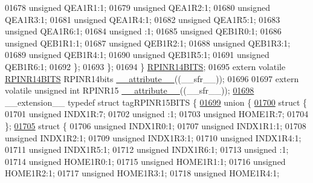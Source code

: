 \begin{DoxyCode}
01678       \textcolor{keywordtype}{unsigned} QEA1R1:1;
01679       \textcolor{keywordtype}{unsigned} QEA1R2:1;
01680       \textcolor{keywordtype}{unsigned} QEA1R3:1;
01681       \textcolor{keywordtype}{unsigned} QEA1R4:1;
01682       \textcolor{keywordtype}{unsigned} QEA1R5:1;
01683       \textcolor{keywordtype}{unsigned} QEA1R6:1;
01684       \textcolor{keywordtype}{unsigned} :1;
01685       \textcolor{keywordtype}{unsigned} QEB1R0:1;
01686       \textcolor{keywordtype}{unsigned} QEB1R1:1;
01687       \textcolor{keywordtype}{unsigned} QEB1R2:1;
01688       \textcolor{keywordtype}{unsigned} QEB1R3:1;
01689       \textcolor{keywordtype}{unsigned} QEB1R4:1;
01690       \textcolor{keywordtype}{unsigned} QEB1R5:1;
01691       \textcolor{keywordtype}{unsigned} QEB1R6:1;
01692     \};
01693   \};
01694 \} \hyperlink{a00014_d8/d86/a00703}{RPINR14BITS};
01695 \textcolor{keyword}{extern} \textcolor{keyword}{volatile} \hyperlink{a00014_d8/d86/a00703}{RPINR14BITS} RPINR14bits \hyperlink{a00015_a493c46f03454991ccc5aa7a6e1dfb2a7}{\_\_attribute\_\_}((\_\_sfr\_\_));
01696 
01697 \textcolor{keyword}{extern} \textcolor{keyword}{volatile} \textcolor{keywordtype}{unsigned} \textcolor{keywordtype}{int}  RPINR15 \hyperlink{a00015_a493c46f03454991ccc5aa7a6e1dfb2a7}{\_\_attribute\_\_}((\_\_sfr\_\_));
\hypertarget{a00015_source_l01698}{}\hyperlink{a00014}{01698} \_\_extension\_\_ \textcolor{keyword}{typedef} \textcolor{keyword}{struct }tagRPINR15BITS \{
\hypertarget{a00015_source_l01699}{}\hyperlink{a00015}{01699}   \textcolor{keyword}{union }\{
\hypertarget{a00015_source_l01700}{}\hyperlink{a00015}{01700}     \textcolor{keyword}{struct }\{
01701       \textcolor{keywordtype}{unsigned} INDX1R:7;
01702       \textcolor{keywordtype}{unsigned} :1;
01703       \textcolor{keywordtype}{unsigned} HOME1R:7;
01704     \};
\hypertarget{a00015_source_l01705}{}\hyperlink{a00015}{01705}     \textcolor{keyword}{struct }\{
01706       \textcolor{keywordtype}{unsigned} INDX1R0:1;
01707       \textcolor{keywordtype}{unsigned} INDX1R1:1;
01708       \textcolor{keywordtype}{unsigned} INDX1R2:1;
01709       \textcolor{keywordtype}{unsigned} INDX1R3:1;
01710       \textcolor{keywordtype}{unsigned} INDX1R4:1;
01711       \textcolor{keywordtype}{unsigned} INDX1R5:1;
01712       \textcolor{keywordtype}{unsigned} INDX1R6:1;
01713       \textcolor{keywordtype}{unsigned} :1;
01714       \textcolor{keywordtype}{unsigned} HOME1R0:1;
01715       \textcolor{keywordtype}{unsigned} HOME1R1:1;
01716       \textcolor{keywordtype}{unsigned} HOME1R2:1;
01717       \textcolor{keywordtype}{unsigned} HOME1R3:1;
01718       \textcolor{keywordtype}{unsigned} HOME1R4:1;

\end{DoxyCode}
